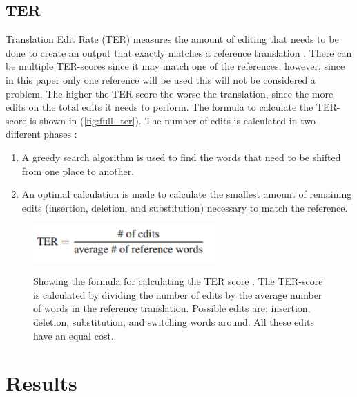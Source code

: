 \subsection{TER}

Translation Edit Rate (TER) measures the amount of editing that needs to be done to create an output that exactly matches a reference translation \cite{TERsnover2006}. There can be multiple TER-scores since it may match one of the references, however, since in this paper only one reference will be used this will not be considered a problem. The higher the TER-score the worse the translation, since the more edits on the total edits it needs to perform. The formula to calculate the TER-score is shown in (\autoref{fig:full_ter}). The number of edits is calculated in two different phases \cite{shapira2002edit}:
\begin{enumerate}
    \item A greedy search algorithm is used to find the words that need to be shifted from one place to another.
    \item An optimal calculation is made to calculate the smallest amount of remaining edits (insertion, deletion, and substitution) necessary to match the reference.
\end{enumerate}



\begin{figure}[h]
 \caption{Showing the formula for calculating the TER score \cite{TERsnover2006}. The TER-score is calculated by dividing the number of edits by the average number of words in the reference translation. Possible edits are: insertion, deletion, substitution, and switching words around. All these edits have an equal cost.}
 \centering 
 \includegraphics[width=7cm]{Bachelor CSAI thesis template/images/ter_formula.PNG}
 \label{fig:full_ter}
\end{figure}




\section{Results}

